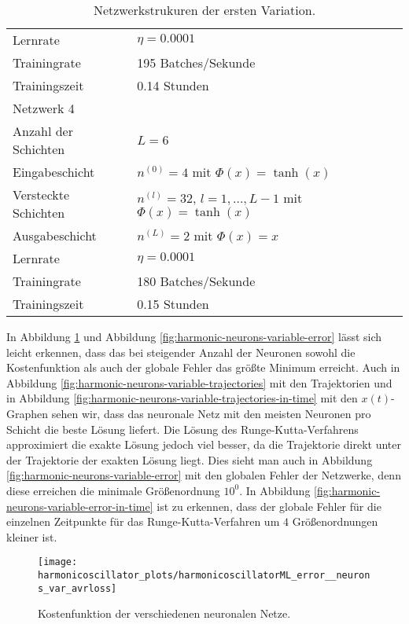 \begin{table}
\begin{tabular}{ l | l }
              Lernrate & $\eta=0.0001$ \\
              Trainingrate & 195 Batches/Sekunde \\
              Trainingszeit & 0.14 Stunden \\
              \hline
              Netzwerk 4 & \\
              \hline
              Anzahl der Schichten & $L=6$ \\
              Eingabeschicht & $n^{(0)}=4$ mit $\Phi(x)=\tanh(x)$ \\
              Versteckte Schichten & $n^{(l)}=32$, $l = 1, \dots, L-1$ mit $\Phi(x)=\tanh(x)$ \\
              Ausgabeschicht & $n^{(L)}=2$ mit $\Phi(x)=x$ \\
              Lernrate & $\eta=0.0001$ \\
              Trainingrate & 180 Batches/Sekunde \\
              Trainingszeit & 0.15 Stunden \\
              \hline
       \end{tabular}
       \caption{Netzwerkstrukuren der ersten Variation.}
       \label{stiff-table-first}
\end{table}
In Abbildung \ref{fig:harmonic-neurons-variable-loss} und Abbildung \ref{fig:harmonic-neurons-variable-error} lässt
sich leicht erkennen, dass das bei steigender Anzahl der Neuronen sowohl die Kostenfunktion als auch der globale Fehler
das größte Minimum erreicht. Auch in Abbildung \ref{fig:harmonic-neurons-variable-trajectories} mit den Trajektorien
und in Abbildung \ref{fig:harmonic-neurons-variable-trajectories-in-time} mit den $x(t)$-Graphen
sehen wir, dass das neuronale Netz mit den meisten Neuronen pro Schicht die beste Lösung liefert. Die Lösung des
Runge-Kutta-Verfahrens approximiert die exakte Lösung jedoch viel besser, da die Trajektorie direkt unter der
Trajektorie der exakten Lösung liegt. Dies sieht man auch in Abbildung \ref{fig:harmonic-neurons-variable-error} mit den
globalen Fehler der Netzwerke, denn diese erreichen die minimale Größenordnung $10^0$. In Abbildung
\ref{fig:harmonic-neurons-variable-error-in-time} ist zu erkennen, dass der globale Fehler für die einzelnen
Zeitpunkte für das Runge-Kutta-Verfahren um $4$ Größenordnungen kleiner ist.
\begin{figure}
       \centering
       \texttt{[image: harmonicoscillator\_plots/harmonicoscillatorML\_error\_\_neurons\_var\_avrloss]}
       \caption{Kostenfunktion der verschiedenen neuronalen Netze.}
       \label{fig:harmonic-neurons-variable-loss}
\end{figure}
